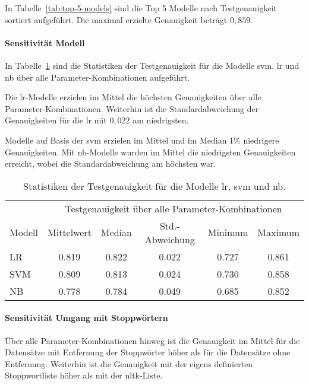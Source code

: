 In Tabelle~\ref{tab:top-5-models} sind die Top 5 Modelle nach Testgenauigkeit sortiert aufgeführt.
Die maximal erzielte Genauigkeit beträgt $0,859$.

\paragraph{Sensitivität Modell}
In Tabelle~\ref{tab:stats-per-model} sind die Statistiken der Testgenauigkeit für die Modelle \gls{svm}, \gls{lr} und \gls{nb} über alle Parameter-Kombinationen aufgeführt.

Die \gls{lr}-Modelle erzielen im Mittel die höchsten Genauigkeiten über alle Parameter-Kombinationen.
Weiterhin ist die Standardabweichung der Genauigkeiten für die \gls{lr} mit $0,022$ am niedrigsten.

Modelle auf Basis der \gls{svm} erzielen im Mittel und im Median 1\% niedrigere Genauigkeiten.
Mit \gls{nb}-Modelle wurden im Mittel die niedrigsten Genauigkeiten erreicht, wobei die Standardabweichung am höchsten war.

\begin{table}
    \center
    \begin{tabular}{lccccc}
        \toprule
        & \multicolumn{5}{c}{Testgenauigkeit über alle Parameter-Kombinationen} \\
        Modell             & Mittelwert & Median & Std.-Abweichung & Minimum & Maximum \\
        \midrule
        LR                 & 0.819      & 0.822  & 0.022           & 0.727   & 0.861 \\
        SVM                & 0.809      & 0.813  & 0.024           & 0.730   & 0.858 \\
        NB                 & 0.778      & 0.784  & 0.049           & 0.685   & 0.852 \\
        \bottomrule
    \end{tabular}
    \caption{Statistiken der Testgenauigkeit für die Modelle \gls{lr}, \gls{svm} und \gls{nb}.}
    \label{tab:stats-per-model}
\end{table}

\paragraph{Sensitivität Umgang mit Stoppwörtern}

Über alle Parameter-Kombinationen hinweg ist die Genauigkeit im Mittel für die Datensätze mit Entfernung der Stoppwörter höher als für die Datensätze ohne Entfernung.
Weiterhin ist die Genauigkeit mit der eigens definierten Stoppwortliste höher als mit der \gls{nltk}-Liste.

